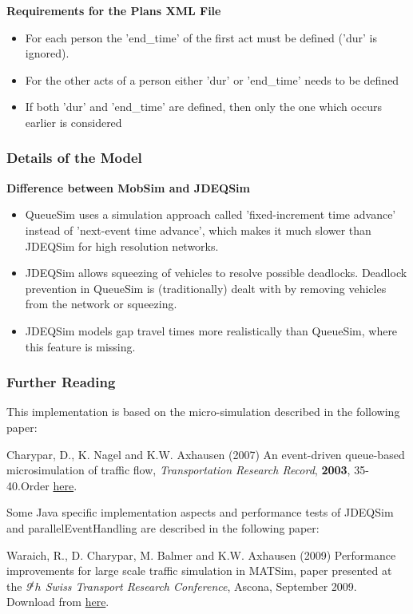 \textbf{Requirements for the Plans XML File
\\}
\begin{itemize}
	\item For each person the 'end\_time' of the first act must be defined ('dur' is ignored).
	\item For the other acts of a person either 'dur' or 'end\_time' needs to be defined
	\item If both 'dur' and 'end\_time' are defined, then only the one which occurs earlier is considered
\end{itemize}

\subsubsection{Details of the Model}

\textbf{Difference between MobSim and JDEQSim}
\begin{itemize}
	\item QueueSim  uses a simulation approach called 'fixed-increment time advance'  instead of 'next-event time advance', which makes it much slower than  JDEQSim for high resolution networks.
	\item JDEQSim allows  squeezing of vehicles to resolve possible deadlocks. Deadlock prevention  in QueueSim is (traditionally) dealt with by removing vehicles from the  network or squeezing.
	\item JDEQSim models gap travel times more realistically than QueueSim, where this feature is missing.
\end{itemize}




\subsubsection{Further Reading}

This implementation is based on the micro-simulation described in the following paper:

Charypar, D., K. Nagel and K.W. Axhausen (2007) An event-driven queue-based microsimulation of traffic flow, \emph{Transportation Research Record}, \textbf{2003}, 35-40.Order \href{http://trb.metapress.com/content/j2118065485r4611/?p=4f63e25a261d48d99eeebea19b494e24&amp;pi=0}{here}.

Some  Java specific implementation aspects and performance tests of JDEQSim  and parallelEventHandling are described in the following paper:

Waraich,  R., D. Charypar, M. Balmer and K.W. Axhausen (2009) Performance  improvements for large scale traffic simulation in MATSim, paper  presented at the \emph{9$^th$ Swiss Transport Research Conference}, Ascona, September 2009. Download from \href{http://www.ivt.ethz.ch/vpl/publications/reports/ab565.pdf}{here}.


















